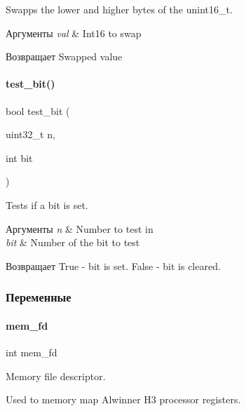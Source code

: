 Swapps the lower and higher bytes of the unint16\+\_\+t. 


\begin{DoxyParams}{Аргументы}
{\em val} & Int16 to swap\\
\hline
\end{DoxyParams}
\begin{DoxyReturn}{Возвращает}
Swapped value 
\end{DoxyReturn}
\mbox{\label{rpp_8c_afab0348d34b69cb01301ecd15019aa9b}} 
\paragraph{test\+\_\+bit()}
{\footnotesize\ttfamily bool test\+\_\+bit (\begin{DoxyParamCaption}\item[{uint32\+\_\+t}]{n,  }\item[{int}]{bit }\end{DoxyParamCaption})}



Tests if a bit is set. 


\begin{DoxyParams}{Аргументы}
{\em n} & Number to test in \\
\hline
{\em bit} & Number of the bit to test\\
\hline
\end{DoxyParams}
\begin{DoxyReturn}{Возвращает}
True -\/ bit is set. False -\/ bit is cleared. 
\end{DoxyReturn}


\subsubsection{Переменные}
\mbox{\label{rpp_8c_ae2f168096b42ceb6288a92145738928f}} 
\paragraph{mem\+\_\+fd}
{\footnotesize\ttfamily int mem\+\_\+fd}



Memory file descriptor. 

Used to memory map Alwinner H3 processor registers. \mbox{\label{rpp_8c_af141ce476253aac60e9b860af70fd6ff}} 
